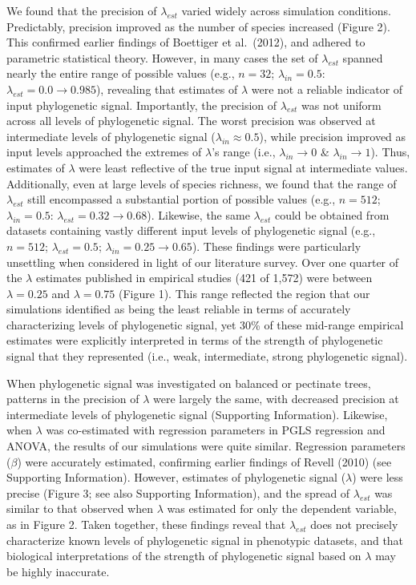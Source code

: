 \documentclass[
]{article}
\begin{document}
{We found that the precision of \(\lambda_{est}\) varied widely across
simulation conditions. Predictably, precision improved as the number of
species increased (Figure 2). This confirmed earlier findings of
Boettiger et al.~(2012), and adhered to parametric statistical theory.
However, in many cases the set of \(\lambda_{est}\) spanned nearly the
entire range of possible values (e.g., \(n=32\); \(\lambda_{in}=0.5\):
\(\lambda_{est}= 0.0\to 0.985\)), revealing that estimates of
\(\lambda\) were not a reliable indicator of input phylogenetic signal.
Importantly, the precision of \(\lambda_{est}\) was not uniform across
all levels of phylogenetic signal. The worst precision was observed at
intermediate levels of phylogenetic signal (\(\lambda_{in}\approx0.5\)),
while precision improved as input levels approached the extremes of
\(\lambda\)'s range (i.e., \(\lambda_{in}\rightarrow0\) \&
\(\lambda_{in}\rightarrow1\)). Thus, estimates of \(\lambda\) were least
reflective of the true input signal at intermediate values.
Additionally, even at large levels of species richness, we found that
the range of \(\lambda_{est}\) still encompassed a substantial portion
of possible values (e.g., \(n=512\); \(\lambda_{in}=0.5\):
\(\lambda_{est} = 0.32\to 0.68\)). Likewise, the same \(\lambda_{est}\)
could be obtained from datasets containing vastly different input levels
of phylogenetic signal (e.g., \(n=512\); \(\lambda_{est} = 0.5\);
\(\lambda_{in} = 0.25 \to 0.65\)). These findings were particularly
unsettling when considered in light of our literature survey. Over one
quarter of the \(\lambda\) estimates published in empirical studies (421
of 1,572) were between \(\lambda=0.25\) and \(\lambda=0.75\) (Figure 1).
This range reflected the region that our simulations identified as being
the least reliable in terms of accurately characterizing levels of
phylogenetic signal, yet 30\% of these mid-range empirical estimates
were explicitly interpreted in terms of the strength of phylogenetic
signal that they represented (i.e., weak, intermediate, strong
phylogenetic signal). \hfill\break

When phylogenetic signal was investigated on balanced or pectinate
trees, patterns in the precision of \(\lambda\) were largely the same,
with decreased precision at intermediate levels of phylogenetic signal
(Supporting Information). Likewise, when \(\lambda\) was co-estimated
with regression parameters in PGLS regression and ANOVA, the results of
our simulations were quite similar. Regression parameters (\(\beta\))
were accurately estimated, confirming earlier findings of Revell (2010)
(see Supporting Information). However, estimates of phylogenetic signal
(\(\lambda\)) were less precise (Figure 3; see also Supporting
Information), and the spread of \(\lambda_{est}\) was similar to that
observed when \(\lambda\) was estimated for only the dependent variable,
as in Figure 2. Taken together, these findings reveal that
\(\lambda_{est}\) does not precisely characterize known levels of
phylogenetic signal in phenotypic datasets, and that biological
interpretations of the strength of phylogenetic signal based on
\(\lambda\) may be highly inaccurate. \hfill\break

}
\end{document}
